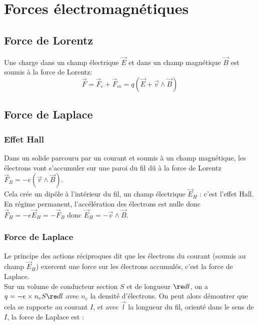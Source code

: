 \documentclass[13pt, twoside, a4paper, french]{report}
\begin{document}
\chapter{Forces électromagnétiques}


    \section{Force de Lorentz}

        Une charge dans un champ électrique $\vec E$ et dans un champ magnétique $\vec B$ est soumis à la force de Lorentz:\\

        \[\vec F = \vec F_e + \vec F_m = q (\vec E + \vec v \wedge \vec B)\]


    \section{Force de Laplace}

        \subsection{Effet Hall}

            Dans un solide parcouru par un courant et soumis à un champ magnétique, les électrons vont s'accumuler sur une paroi du fil dû à la force de Lorentz $\vec F_B = -e (\vec v \wedge \vec B)$.\\

            Cela crée un dipôle à l'intérieur du fil, un champ électrique $\vec E_H$ : c'est l'effet Hall.\\
            En régime permanent, l'accélération des électrons est nulle donc $\vec F_H = -e \vec E_H = - \vec F_B$ donc $\vec E_H = - \vec v \wedge \vec B$.\\

        \subsection{Force de Laplace}

            Le principe des actions réciproques dit que les électrons du courant (soumis au champ $\vec E_H$) exercent une force sur les électrons accumulés, c'est la force de Laplace.\\

            Sur un volume de conducteur section $S$ et de longueur $\re d l$, on a $q = -e \times n_e S \re d l$ avec $n_e$ la densité d'électrons. On peut alors démontrer que cela se rapporte au courant $I$, et avec $\vec l$ la longueur du fil, orienté dans le sens de $I$, la force de Laplace est :
\end{document}
